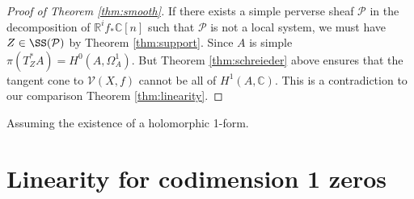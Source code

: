 \documentclass[12pt,reqno]{amsart}
\theoremstyle{question}
\theoremstyle{definition}
\theoremstyle{remark}
\theoremstyle{cited}
\theoremstyle{citeddef}
\newcommand{\sP}{\mathcal{P}}
\newcommand\sV{{\mathcal V}}
\newcommand{\bbC}{\mathbb{C}}
\newcommand{\bbR}{\mathbb{R}}
\begin{document}
\begin{proof}[Proof of Theorem \ref{thm:smooth}]
If there exists a simple perverse sheaf $\sP$ in the decomposition of $\bbR^i f_*\bbC[n]$ such that $\sP$ is not a local system,
we must have $Z\in\SS(\sP)$ by Theorem \ref{thm:support}. Since $A$ is simple $\pi(T^*_ZA) = H^0(A, \Omega_A^1)$. 
But Theorem \ref{thm:schreieder} above ensures that the tangent cone to $\sV(X, f)$ cannot be all of $H^1(A, \bbC)$.
This is a contradiction to our comparison Theorem \ref{thm:linearity}.

\end{proof}


Assuming the existence of a holomorphic 1-form.




\section{Linearity for codimension 1 zeros}













\end{document}
